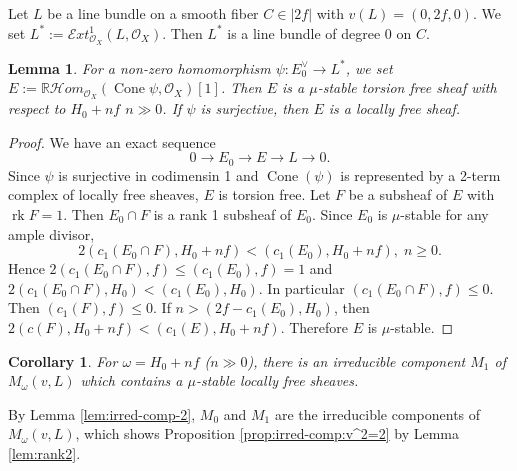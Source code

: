 \documentclass[leqno,11pt]{amsart}
\def\R{\ensuremath{\mathbb{R}}}
\def\rk{\mathop{\mathrm{rk}}}
\def\Cone{\mathop{\mathrm{Cone}}\nolimits}
\newtheorem{Lem}[Thm]{Lemma}
\newtheorem{Cor}[Thm]{Corollary}
\theoremstyle{definition}
\def\R{\ensuremath{\mathbb{R}}}
\def\EE{\ensuremath{\mathcal E}}
\def\HH{\ensuremath{\mathcal H}}
\def\OO{\ensuremath{\mathcal O}}
\begin{document}
Let $L$ be a line bundle on a smooth fiber $C \in |2f|$ with $v(L)=(0,2f,0)$.
We set $L^*:=\EE xt^1_{\OO_X}(L,\OO_X)$.
Then $L^*$ is a line bundle of degree 0 on $C$.
\begin{Lem}\label{Lem:M_1}
For a non-zero homomorphism
$\psi:E_0^{\vee} \to L^*$, 
we set $E:=\R \HH om_{\OO_X}(\Cone \psi,\OO_X)[1]$.
Then $E$ is a $\mu$-stable torsion free sheaf with respect to
$H_0+nf$ $n \gg 0$.
If $\psi$ is surjective, then $E$ is a locally free sheaf.
\end{Lem}

\begin{proof}
We have an exact sequence
\begin{equation}
0 \to E_0 \to E \to L \to 0.
\end{equation} 
Since $\psi$ is surjective in codimensin 1 and
$\Cone(\psi)$ is represented by a 2-term complex of locally free sheaves,
$E$ is torsion free.
Let $F$ be a subsheaf of $E$ with $\rk F=1$.
Then $E_0 \cap F$ is a  rank 1 subsheaf of $E_0$.
Since $E_0$ is $\mu$-stable for any ample divisor,
$$
2(c_1(E_0 \cap F),H_0+nf)<(c_1(E_0),H_0+nf),\;n \geq 0.
$$
Hence $2(c_1(E_0 \cap F),f) \leq (c_1(E_0),f)=1$ and
$2(c_1(E_0 \cap F),H_0)<(c_1(E_0),H_0)$.
In particular
$(c_1(E_0 \cap F),f) \leq 0$.
Then $(c_1(F),f) \leq 0$.
If $n>(2f-c_1(E_0),H_0)$, then $2(c(F),H_0+nf)<(c_1(E),H_0+nf)$.
Therefore $E$ is $\mu$-stable.
\end{proof}

\begin{Cor}
For $\omega=H_0+n f$ ($n \gg 0$),
there is an irreducible component $M_1$ of $M_\omega(v,L)$ 
which contains a $\mu$-stable locally free sheaves.
\end{Cor}



By Lemma \ref{lem:irred-comp-2}, $M_0$ and $M_1$ are the irreducible components
of $M_\omega(v,L)$, which shows
Proposition \ref{prop:irred-comp:v^2=2} by Lemma \ref{lem:rank2}.



















\end{document}

